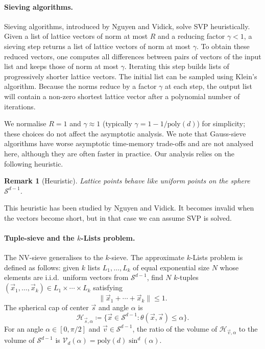 \documentclass[10pt,a4paper]{article}
\newtheorem{remark}[theorem]{Remark}
\begin{document}
\paragraph{Sieving algorithms.}
Sieving algorithms, introduced by Nguyen and Vidick, solve SVP heuristically. Given a list of lattice vectors of norm at most \(R\) and a reducing factor \(\gamma<1\), a sieving step returns a list of lattice vectors of norm at most \(\gamma\). To obtain these reduced vectors, one computes all differences between pairs of vectors of the input list and keeps those of norm at most \(\gamma\). Iterating this step builds lists of progressively shorter lattice vectors. The initial list can be sampled using Klein's algorithm. Because the norms reduce by a factor \(\gamma\) at each step, the output list will contain a non-zero shortest lattice vector after a polynomial number of iterations.

We normalise \(R=1\) and \(\gamma\approx 1\) (typically \(\gamma=1-1/\mathrm{poly}(d)\)) for simplicity; these choices do not affect the asymptotic analysis. We note that Gauss-sieve algorithms have worse asymptotic time-memory trade-offs and are not analysed here, although they are often faster in practice. Our analysis relies on the following heuristic.

\begin{remark}[Heuristic]
Lattice points behave like uniform points on the sphere \(\mathcal{S}^{d-1}\).
\end{remark}

This heuristic has been studied by Nguyen and Vidick. It becomes invalid when the vectors become short, but in that case we can assume SVP is solved.

\paragraph{Tuple-sieve and the \(k\)-Lists problem.}
The NV-sieve generalises to the \(k\)-sieve. The approximate \(k\)-Lists problem is defined as follows: given \(k\) lists \(L_1,\ldots,L_k\) of equal exponential size \(N\) whose elements are i.i.d.\ uniform vectors from \(\mathcal{S}^{d-1}\), find \(N\) \(k\)-tuples \((\vec{x}_1,\ldots,\vec{x}_k)\in L_1\times\cdots\times L_k\) satisfying
\begin{equation}
\|\vec{x}_1+\cdots+\vec{x}_k\| \le 1.
\end{equation}
The spherical cap of center \(\vec{s}\) and angle \(\alpha\) is
\begin{equation}
\mathcal{H}_{\vec{s},\alpha} \coloneqq \{\vec{x}\in\mathcal{S}^{d-1} : \theta(\vec{x},\vec{s})\le\alpha\}.
\end{equation}
For an angle \(\alpha\in[0,\pi/2]\) and \(\vec{v}\in\mathcal{S}^{d-1}\), the ratio of the volume of \(\mathcal{H}_{\vec{v},\alpha}\) to the volume of \(\mathcal{S}^{d-1}\) is \(\mathcal{V}_d(\alpha)=\mathrm{poly}(d)\sin^d(\alpha)\).
\end{document}

